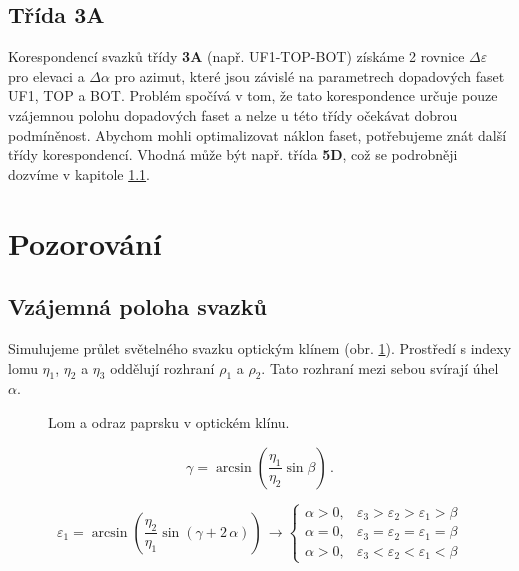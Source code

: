 \subsection{Třída \textbf{3A}}
Korespondencí svazků třídy \textbf{3A} (např. UF1-TOP-BOT) získáme 2 rovnice $\Delta \varepsilon$ pro elevaci a $\Delta \alpha$ pro azimut, které jsou závislé na parametrech dopadových faset UF1, TOP a BOT. Problém spočívá v tom, že tato korespondence určuje pouze vzájemnou polohu dopadových faset a nelze u této třídy očekávat dobrou podmíněnost. 
Abychom mohli optimalizovat náklon faset, potřebujeme znát další třídy korespondencí. Vhodná může být např. třída \textbf{5D}, což se podrobněji dozvíme v kapitole \ref{sec: klin}.

\section{Pozorování}

\subsection{Vzájemná poloha svazků}
\label{sec: klin}
Simulujeme průlet světelného svazku optickým klínem (obr. \ref{fig:wedge}). Prostředí s indexy lomu $\eta_1$, $\eta_2$ a $\eta_3$ oddělují rozhraní $\rho_1$ a $\rho_2$. Tato rozhraní mezi sebou svírají úhel $\alpha$.
\begin{figure}[h!]
\begin{center}
\scalebox{0.725}{ }
\end{center}
\caption{Lom a odraz paprsku v optickém klínu.}
\label{fig:wedge}
\end{figure}

\begin{equation}
\gamma = \arcsin{\left(\frac{\eta_1}{\eta_2}\sin{\beta}\right)}\,.
\end{equation}

\begin{equation}
\varepsilon_1 = \arcsin{\left(\frac{\eta_2}{\eta_1}\sin{\left(\gamma + 2\,\alpha\right)}\right)}\, 
\rightarrow \begin{cases}
\alpha > 0, & \varepsilon_3 > \varepsilon_2 > \varepsilon_1 > \beta\\
\alpha = 0, & \varepsilon_3 = \varepsilon_2 = \varepsilon_1 = \beta\\
\alpha > 0, & \varepsilon_3 < \varepsilon_2 < \varepsilon_1 < \beta
\end{cases}
\end{equation}


